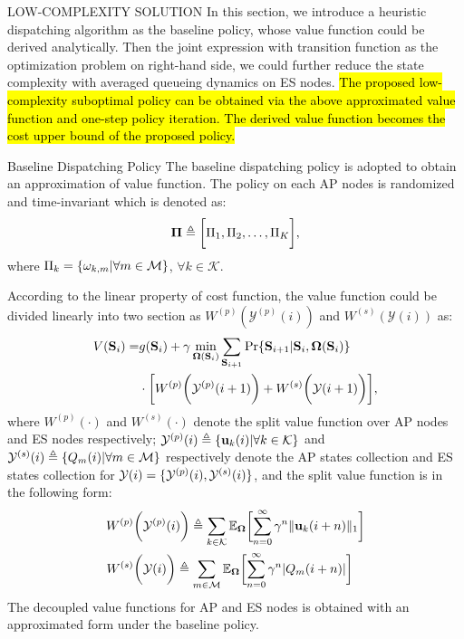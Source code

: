 \documentclass[10pt, conference, letterpaper]{IEEEtran}
\newcommand{\define}{\triangleq}
\renewcommand{\vec}{\mathbf}
\DeclarePairedDelimiter{\set}{\{}{\}}
\DeclarePairedDelimiter{\Inorm}{\|}{\|_1}
\DeclarePairedDelimiter{\Paren}{\bigg(}{\bigg)}
\DeclarePairedDelimiter{\Bracket}{\bigg[}{\bigg]}
\newcommand{\apSet}{\mathcal{K}}
\newcommand{\esSet}{\mathcal{M}}
\newcommand{\Stat}{\mathbf{S}}
\newcommand{\Obsv}{\mathcal{Y}}
\newcommand{\Policy}{\mathbf{\Omega}}
\begin{document}
    \begin{section}{LOW-COMPLEXITY SOLUTION}
        \label{sec:algorithm}
        In this section, we introduce a heuristic dispatching algorithm as the baseline policy, whose value function could be derived analytically. Then the joint expression with transition function as the optimization problem on right-hand side, we could further reduce the state complexity with averaged queueing dynamics on ES nodes.
        \hl{The proposed low-complexity suboptimal policy can be obtained via the above approximated value function and one-step policy iteration. The derived value function becomes the cost upper bound of the proposed policy.}

        \begin{subsection}{Baseline Dispatching Policy}
            The baseline dispatching policy is adopted to obtain an approximation of value function. The policy on each AP nodes is randomized and time-invariant which is denoted as:
            \begin{align}
                \vec{\Pi} \define \Bracket{\Pi_1, \Pi_2, \dots, \Pi_K},
            \end{align}
            where $\Pi_k = \set{\omega_{k,m}|\forall m\in\esSet}$, $\forall k\in\apSet$.

            According to the linear property of cost function, the value function could be divided linearly into two section as $ W^{(p)}(\Obsv^{(p)}(i))$ and $W^{(s)}(\Obsv(i))$ as:
            \begin{align}
                V(\Stat_{i}) =& 
                    g(\Stat_{i}) + \gamma \min_{\Policy(\Stat_{i})} \sum_{\Stat_{i+1}} \Pr\{ \Stat_{i+1}|\Stat_{i}, \Policy(\Stat_{i}) \}
                    \nonumber\\
                    & \cdot \Bracket{ W^{(p)}\Paren{\Obsv^{(p)}(i+1)} + W^{(s)}\Paren{\Obsv(i+1)} },
            \end{align}
            where $W^{(p)}(\cdot)$ and $W^{(s)}(\cdot)$ denote the split value function over AP nodes and ES nodes respectively; $\Obsv^{(p)}(i) \define \set{\vec{u}_k(i)|\forall k\in\apSet}$ and $\Obsv^{(s)}(i) \define \set{Q_m(i)|\forall m\in\esSet}$ respectively denote the AP states collection and ES states collection for $\Obsv(i) = \set{\Obsv^{(p)}(i), \Obsv^{(s)}(i)}$, and the split value function is in the following form:
            \begin{align}
                W^{(p)}&\Paren{\Obsv^{(p)}(i)} \define \sum_{k\in\apSet}
                    \mathbb{E}_{\Policy}\Bracket{\sum_{n=0}^{\infty} \gamma^{n} \Inorm{\vec{u}_k(i+n)}}
                \\
                W^{(s)}&\Paren{\Obsv(i)} \define \sum_{m\in\esSet}
                    \mathbb{E}_{\Policy}\Bracket{\sum_{n=0}^{\infty} \gamma^{n} |Q_m(i+n)|}
            \end{align}
            The decoupled value functions for AP and ES nodes is obtained with an approximated form under the baseline policy.


\end{subsection}
\end{section}
\end{document}
